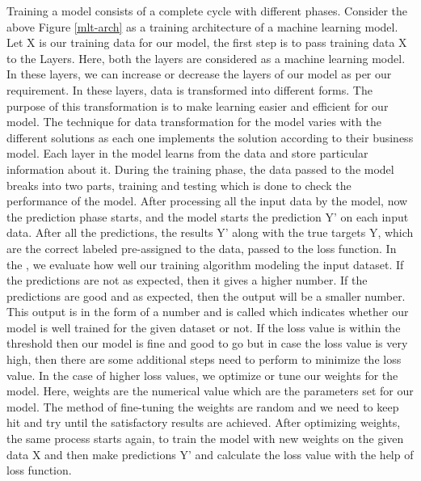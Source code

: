 Training a model consists of a complete cycle with different phases. Consider the above Figure \ref{mlt-arch} as a training architecture of a machine learning model. Let X is our training data for our model, the first step is to pass training data X to the Layers. Here, both the layers are considered as a machine learning model. In these layers, we can increase or decrease the layers of our model as per our requirement. In these layers, data is transformed into different forms. The purpose of this transformation is to make learning easier and efficient for our model. The technique for data transformation for the model varies with the different solutions as each one implements the solution according to their business model. Each layer in the model learns from the data and store particular information about it. During the training phase, the data passed to the model breaks into two parts, training and testing which is done to check the performance of the model. After processing all the input data by the model, now the prediction phase starts, and the model starts the prediction Y' on each input data. After all the predictions, the results Y' along with the true targets Y, which are the correct labeled pre-assigned to the data, passed to the loss function. In the , we evaluate how well our training algorithm modeling the input dataset. If the predictions are not as expected, then it gives a higher number. If the predictions are good and as expected, then the output will be a smaller number. This output is in the form of a number and is called  which indicates whether our model is well trained for the given dataset or not. If the loss value is within the threshold then our model is fine and good to go but in case the loss value is very high, then there are some additional steps need to perform to minimize the loss value. In the case of higher loss values, we optimize or tune our weights for the model. Here, weights are the numerical value which are the parameters set for our model. The method of fine-tuning the weights are random and we need to keep hit and try until the satisfactory results are achieved. After optimizing weights, the same process starts again, to train the model with new weights on the given data X and then make predictions Y' and calculate the loss value with the help of loss function.
